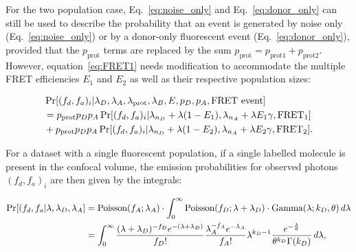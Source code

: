 For the two population case, Eq.~\ref{eq:noise_only} and Eq.~\ref{eq:donor_only} can still be used to describe the probability that an event is generated by noise only (Eq.~\ref{eq:noise_only}) or by a donor-only fluorescent event (Eq.~\ref{eq:donor_only}), provided that the $p_{\text{prot}}$ terms are replaced by the sum $p_{\text{prot}}=p_{\text{prot1}}+p_{\text{prot2}}$. However, equation~\ref{eq:FRET1} needs modification to accommodate the multiple FRET efficiencies $E_1$ and $E_2$ as well as their respective population sizes: 

\begin{equation}
\begin{aligned}
\footnotesize
&\Pr[(f_d, f_a)_i|\lambda_D, \lambda_A, \lambda_{\text{prot}}, \lambda_B, E, p_D, p_A, \text{FRET event}] \\
&=p_{\text{prot}}p_Dp_A\Pr[(f_d, f_a)_i|\lambda_{n_D}+\lambda(1-E_1), \lambda_{n_A}+\lambda E_1 \gamma, \text{FRET$_1$}] \\
&+ p_{\text{prot}}p_Dp_A\Pr[(f_d, f_a)_i|\lambda_{n_D}+\lambda(1-E_2), \lambda_{n_A}+\lambda E_2 \gamma, \text{FRET$_2$}].
\label{eq:FRET2} 
\end{aligned}
\end{equation}


For a dataset with a single fluorescent population, if a single labelled molecule is present in the confocal volume, the emission probabilities for observed photons $(f_d, f_a)_i$ are then given by the integrals:

\begin{align}
\footnotesize
\Pr[(f_d, f_a| \lambda, \lambda_{D}, \lambda_{A}] 
&= \text{Poisson}(f_A; \lambda_{A}) \cdot \int_0^{\infty} \text{Poisson}(f_D; \lambda + \lambda_{D})\cdot \text{Gamma}(\lambda; k_D, \theta) \, d\lambda \\
&= \int_0^{\infty} \frac{(\lambda + \lambda_{D})^{-f_D} e^{-(\lambda + \lambda_{D})}}{f_D!} \frac{\lambda_{A}^{-f_A} e^{-\lambda_{A}}}{f_A!} \lambda^{k_D-1} \frac{e^{-\frac{\lambda}{\theta}}}{\theta^{k_D}\Gamma(k_D)} \, d\lambda ,
\end{align} 

